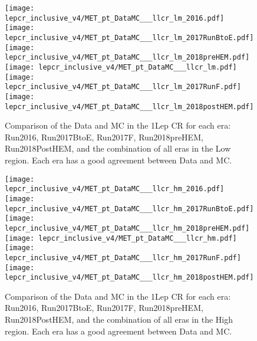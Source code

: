 \begin{figure}[!htb]
	\begin{center}
  \texttt{[image: lepcr\_inclusive\_v4/MET\_pt\_DataMC\_\_\_llcr\_lm\_2016.pdf]}
  \texttt{[image: lepcr\_inclusive\_v4/MET\_pt\_DataMC\_\_\_llcr\_lm\_2017RunBtoE.pdf]}
  \texttt{[image: lepcr\_inclusive\_v4/MET\_pt\_DataMC\_\_\_llcr\_lm\_2018preHEM.pdf]} \\
  \texttt{[image: lepcr\_inclusive\_v4/MET\_pt\_DataMC\_\_\_llcr\_lm.pdf]}
  \texttt{[image: lepcr\_inclusive\_v4/MET\_pt\_DataMC\_\_\_llcr\_lm\_2017RunF.pdf]}
  \texttt{[image: lepcr\_inclusive\_v4/MET\_pt\_DataMC\_\_\_llcr\_lm\_2018postHEM.pdf]} \\
	\end{center}
	\caption[Lost Lepton LM Eras ]{Comparison of the Data and MC in the 1Lep CR for each era: Run2016, Run2017BtoE, Run2017F, Run2018preHEM, Run2018PostHEM, and the combination of all eras in the Low \dm{} region. Each era has a good agreement between Data and MC. 
	 }
	\label{fig:llb-1lcr-datavsmc-lm-inclusive}
\end{figure}
\begin{figure}[!htb]
	\begin{center}  
		\texttt{[image: lepcr\_inclusive\_v4/MET\_pt\_DataMC\_\_\_llcr\_hm\_2016.pdf]}
		  \texttt{[image: lepcr\_inclusive\_v4/MET\_pt\_DataMC\_\_\_llcr\_hm\_2017RunBtoE.pdf]}
		  \texttt{[image: lepcr\_inclusive\_v4/MET\_pt\_DataMC\_\_\_llcr\_hm\_2018preHEM.pdf]} \\
		  \texttt{[image: lepcr\_inclusive\_v4/MET\_pt\_DataMC\_\_\_llcr\_hm.pdf]}
		  \texttt{[image: lepcr\_inclusive\_v4/MET\_pt\_DataMC\_\_\_llcr\_hm\_2017RunF.pdf]}
		  \texttt{[image: lepcr\_inclusive\_v4/MET\_pt\_DataMC\_\_\_llcr\_hm\_2018postHEM.pdf]} \\
	\end{center}
	\caption[Lost Lepton HM Eras]{Comparison of the Data and MC in the 1Lep CR for each era: Run2016, Run2017BtoE, Run2017F, Run2018preHEM, Run2018PostHEM, and the combination of all eras in the High \dm{} region. Each era has a good agreement between Data and MC. 
	 }
	\label{fig:llb-1lcr-datavsmc-hm-inclusive}
\end{figure}

